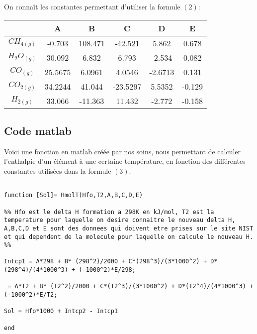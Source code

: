\documentclass[11pt,a4paper]{report}
\begin{document}
On connaît les constantes permettant d'utiliser la formule $(2)$:

\begin{tabular}{|c|c|c|c|c|c|}
\hline 
\rule[-1ex]{0pt}{2.5ex}  & A & B & C & D & E \\ 
\hline 
\rule[-1ex]{0pt}{2.5ex} $CH_{4(g)}$ & -0.703 & 108.471 & -42.521 & 5.862 & 0.678 \\ 
\hline 
\rule[-1ex]{0pt}{2.5ex} $H_2O_{(g)}$ & 30.092 & 6.832 & 6.793 & -2.534 & 0.082 \\ 
\hline 
\rule[-1ex]{0pt}{2.5ex} $CO_{(g)}$ & 25.5675 & 6.0961 & 4.0546 & -2.6713 & 0.131 \\ 
\hline 
\rule[-1ex]{0pt}{2.5ex} $CO_{2(g)}$ & 34.2244 & 41.044 & -23.5297 & 5.5352 & -0.129 \\ 
\hline 
\rule[-1ex]{0pt}{2.5ex} $H_{2(g)}$ & 33.066 & -11.363 & 11.432 & -2.772 & -0.158 \\ 
\hline 
\end{tabular} 


\subsection*{Code matlab}
Voici une fonction en matlab créée par nos soins, nous permettant de calculer l'enthalpie d'un élément à une certaine
température, en fonction des différentes constantes utilisées dans la formule $(3)$.


\lstset{language=Matlab,breaklines=true}
\begin{lstlisting}[frame=single]

function [Sol]= HmolT(Hfo,T2,A,B,C,D,E)

%% Hfo est le delta H formation a 298K en kJ/mol, T2 est la temperature pour laquelle on desire connaitre le nouveau delta H, A,B,C,D et E sont des donnees qui doivent etre prises sur le site NIST et qui dependent de la molecule pour laquelle on calcule le nouveau H.
%%

Intcp1 = A*298 + B* (298^2)/2000 + C*(298^3)/(3*1000^2) + D*(298^4)/(4*1000^3) + (-1000^2)*E/298;

 = A*T2 + B* (T2^2)/2000 + C*(T2^3)/(3*1000^2) + D*(T2^4)/(4*1000^3) + (-1000^2)*E/T2;

Sol = Hfo*1000 + Intcp2 - Intcp1

end
\end{lstlisting}
\end{document}
